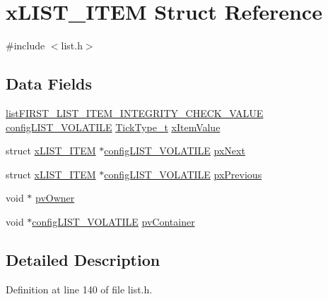 \hypertarget{structx_l_i_s_t___i_t_e_m}{}\section{x\+L\+I\+S\+T\+\_\+\+I\+T\+EM Struct Reference}
\label{structx_l_i_s_t___i_t_e_m}


{\ttfamily \#include $<$list.\+h$>$}

\subsection*{Data Fields}
\begin{DoxyCompactItemize}
\item 
\hyperlink{list_8h_a3611bd5d5d87cb26ac1dc7a4852b94a0}{list\+F\+I\+R\+S\+T\+\_\+\+L\+I\+S\+T\+\_\+\+I\+T\+E\+M\+\_\+\+I\+N\+T\+E\+G\+R\+I\+T\+Y\+\_\+\+C\+H\+E\+C\+K\+\_\+\+V\+A\+L\+UE} \hyperlink{list_8h_a2d5de557c5561c8980d1bf51d87d8cba}{config\+L\+I\+S\+T\+\_\+\+V\+O\+L\+A\+T\+I\+LE} \hyperlink{portmacro_8h_aa69c48c6e902ce54f70886e6573c92a9}{Tick\+Type\+\_\+t} \hyperlink{structx_l_i_s_t___i_t_e_m_a9b1f26de79f9da1403ca3ebc7a2e653a}{x\+Item\+Value}
\item 
struct \hyperlink{structx_l_i_s_t___i_t_e_m}{x\+L\+I\+S\+T\+\_\+\+I\+T\+EM} $\ast$\hyperlink{list_8h_a2d5de557c5561c8980d1bf51d87d8cba}{config\+L\+I\+S\+T\+\_\+\+V\+O\+L\+A\+T\+I\+LE} \hyperlink{structx_l_i_s_t___i_t_e_m_a03713c4ee953ef5ca6adbec883720c60}{px\+Next}
\item 
struct \hyperlink{structx_l_i_s_t___i_t_e_m}{x\+L\+I\+S\+T\+\_\+\+I\+T\+EM} $\ast$\hyperlink{list_8h_a2d5de557c5561c8980d1bf51d87d8cba}{config\+L\+I\+S\+T\+\_\+\+V\+O\+L\+A\+T\+I\+LE} \hyperlink{structx_l_i_s_t___i_t_e_m_ae8e553eae41010a8e41c66d76c94110b}{px\+Previous}
\item 
void $\ast$ \hyperlink{structx_l_i_s_t___i_t_e_m_aeb3110b50fe0dbce826d929b27b5ddb1}{pv\+Owner}
\item 
void $\ast$\hyperlink{list_8h_a2d5de557c5561c8980d1bf51d87d8cba}{config\+L\+I\+S\+T\+\_\+\+V\+O\+L\+A\+T\+I\+LE} \hyperlink{structx_l_i_s_t___i_t_e_m_a341462d06236aa07eaf1a864e4b59951}{pv\+Container}
\end{DoxyCompactItemize}


\subsection{Detailed Description}


Definition at line 140 of file list.\+h.



